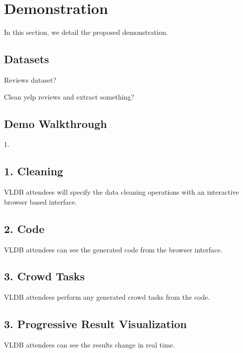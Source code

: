\section{Demonstration}
In this section, we detail the proposed demonstration.

\subsection{Datasets}

Reviews dataset?

Clean yelp reviews and extract something?


\subsection{Demo Walkthrough}


1. 

\subsection{1. Cleaning}
VLDB attendees will specify the data cleaning operations with an interactive browser based
interface. 

\subsection{2. Code}
VLDB attendees can see the generated code from the browser interface.

\subsection{3. Crowd Tasks}
VLDB attendees perform any generated crowd tasks from the code.  

\subsection{3. Progressive Result Visualization}
VLDB attendees can see the results change in real time.  
